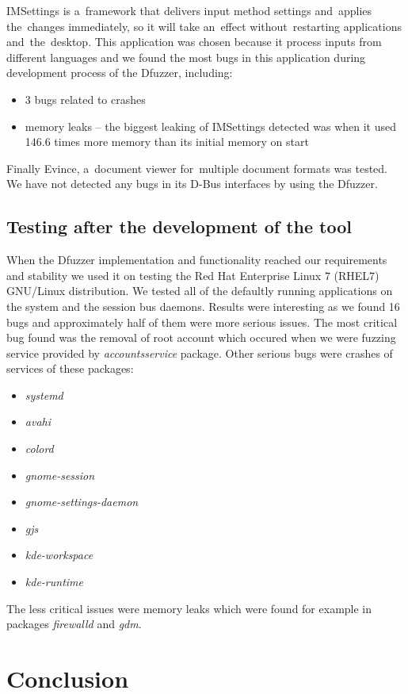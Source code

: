 \documentclass[conference]{IEEEtran}
\begin{document}
IMSettings is a~framework that delivers input method settings and~applies the~changes
immediately, so it will take an~effect without~restarting applications
and~the~desktop. This application was chosen because it process inputs
from different languages and we found the most bugs in this application during
development process of the Dfuzzer, including:
\begin{itemize}
	\item 3 bugs related to crashes
	\item memory leaks -- the biggest leaking of IMSettings detected was when it
		used 146.6 times more memory than its initial memory on start
\end{itemize}

Finally Evince, a~document viewer for~multiple document formats was tested.
We have not detected any bugs in its D-Bus interfaces by using the Dfuzzer.

\subsection{Testing after the development of the tool}
When the Dfuzzer implementation and functionality reached our requirements
and stability we used it on testing the Red Hat Enterprise Linux 7 (RHEL7)
GNU/Linux distribution. We tested all of the defaultly running applications
on the system and the session bus daemons. Results were interesting as we found
16 bugs and approximately half of them were more serious issues. The most
critical bug found was the removal of root account which occured when we were
fuzzing service provided by \emph{accountsservice} package. Other serious bugs
were crashes of services of these packages:
\begin{itemize}
	\item \emph{systemd}
	\item \emph{avahi}
	\item \emph{colord}
	\item \emph{gnome-session}
	\item \emph{gnome-settings-daemon}
	\item \emph{gjs}
	\item \emph{kde-workspace}
	\item \emph{kde-runtime}
\end{itemize}
The less critical issues were memory leaks which were found for example in packages
\emph{firewalld} and \emph{gdm}.


\section{Conclusion}
\end{document}
